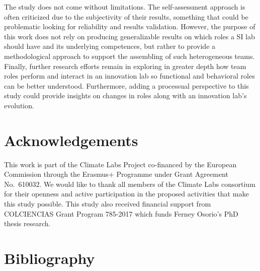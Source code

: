 \documentclass[AMA,STIX1COL,APA,STIX2COL]{WileyNJD-v2}
\begin{document}
The study does not come without limitations. The self-assessment
approach is often criticized due to the subjectivity of their results,
something that could be problematic looking for reliability and results
validation. However, the purpose of this work does not rely on producing
generalizable results on which roles a SI lab should have and its
underlying competences, but rather to provide a methodological approach
to support the assembling of such heterogeneous teams. Finally, further
research efforts remain in exploring in greater depth how team roles
perform and interact in an innovation lab so functional and behavioral
roles can be better understood. Furthermore, adding a processual
perspective to this study could provide insights on changes in roles
along with an innovation lab's evolution.

\hypertarget{acknowledgements}{%
\section{Acknowledgements}\label{acknowledgements}}

This work is part of the Climate Labs Project co-financed by the
European Commission through the Erasmus+ Programme under Grant Agreement
No.~610032. We would like to thank all members of the Climate Labs
consortium for their openness and active participation in the proposed
activities that make this study possible. This study also received
financial support from COLCIENCIAS Grant Program 785-2017 which funds
Ferney Osorio's PhD thesis research.

\newpage

\hypertarget{bibliography}{%
\section*{Bibliography}\label{bibliography}}
\end{document}
